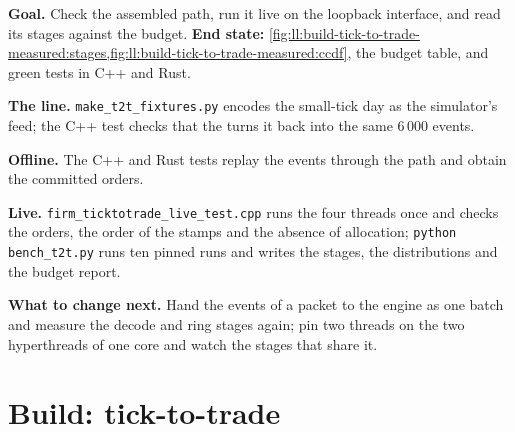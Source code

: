 \begin{tutorial}
\textbf{Goal.} Check the assembled path, run it live on the loopback interface, and read its stages against the budget.
\textbf{End state:} \cref{fig:ll:build-tick-to-trade-measured:stages,fig:ll:build-tick-to-trade-measured:ccdf}, the budget
table, and green tests in C++ and Rust.
\begin{tutsteps}
\item \textbf{The line.} \texttt{make\_t2t\_fixtures.py} encodes the small-tick day as the simulator's feed; the C++ test checks
that the  turns it back into the same 6\,000 events.
\item \textbf{Offline.} The C++ and Rust tests replay the events through the path and obtain the committed orders.
\item \textbf{Live.} \texttt{firm\_ticktotrade\_live\_test.cpp} runs the four threads once and checks the orders, the order of
the stamps and the absence of allocation; \texttt{python bench\_t2t.py} runs ten pinned runs and writes the stages, the
distributions and the budget report.
\end{tutsteps}
\textbf{What to change next.} Hand the events of a packet to the engine as one batch and measure the decode and ring stages
again; pin two threads on the two hyperthreads of one core and watch the stages that share it.
\end{tutorial}

\section{Build: tick-to-trade}\label{bld:ll:build-tick-to-trade-measured:ticktotrade}


